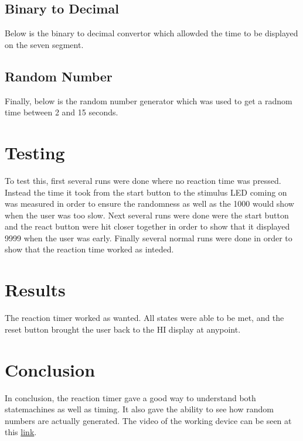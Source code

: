 \documentclass[12pt]{article}
\newcommand{\Verilog}[2][]{%
	
}
\begin{document}
\subsection{Binary to Decimal}
Below is the binary to decimal convertor which allowded the time to be displayed on the seven segment. 
\Verilog[firstline=23]{./bin_2_bcd.sv}
\subsection{Random Number}
Finally, below is the random number generator which was used to get a radnom time between 2 and 15 seconds. 

\section{Testing}
To test this, first several runs were done where no reaction time was pressed. Instead the time it took from the start button to the stimulus LED coming on was measured in order to ensure the randomness as well as the 1000 would show when the user was too slow. Next several runs were done were the start button and the react button were hit closer together in order to show that it displayed 9999 when the user was early. Finally several normal runs were done in order to show that the reaction time worked as inteded. 


\section{Results}
The reaction timer worked as wanted. All states were able to be met, and the reset button brought the user back to the HI display at anypoint.

\section{Conclusion}
In conclusion, the reaction timer gave a good way to understand both statemachines as well as timing. It also gave the ability to see how random numbers are actually generated. The video of the working device can be seen at this \href{https://www.youtube.com/watch?v=FZpEwH8YCFI}{link}.
\end{document}
